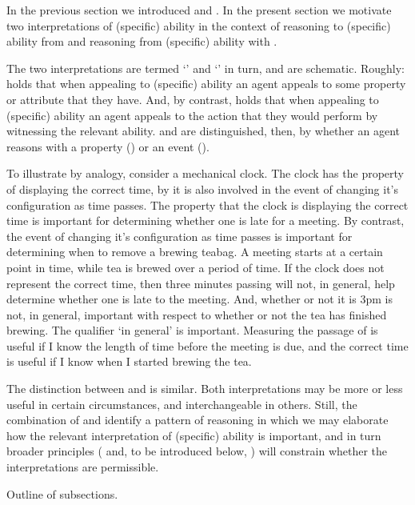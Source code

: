 \begin{note}
  In the previous section we introduced  and .
  In the present section we motivate two interpretations of (specific) ability in the context of reasoning to (specific) ability from \gsi{} and reasoning from (specific) ability with .

  The two interpretations are termed `\AR{}' and `\WR{}' in turn, and are schematic.
  Roughly:
  \AR{} holds that when appealing to (specific) ability an agent appeals to some property or attribute that they have.
  And, by contrast, \WR{} holds that when appealing to (specific) ability an agent appeals to the action that they would perform by witnessing the relevant ability.
  \AR{} and \WR{} are distinguished, then, by whether an agent reasons with a property (\AR{}) or an event (\WR{}).

  To illustrate by analogy, consider a mechanical clock.
  The clock has the property of displaying the correct time, by it is also involved in the event of changing it's configuration as time passes.
  The property that the clock is displaying the correct time is important for determining whether one is late for a meeting.
  By contrast, the event of changing it's configuration as time passes is important for determining when to remove a brewing teabag.
  A meeting starts at a certain point in time, while tea is brewed over a period of time.
  If the clock does not represent the correct time, then three minutes passing will not, in general, help determine whether one is late to the meeting.
  And, whether or not it is 3pm is not, in general, important with respect to whether or not the tea has finished brewing.
  The qualifier `in general' is important.
  Measuring the passage of is useful if I know the length of time before the meeting is due, and the correct time is useful if I know when I started brewing the tea.

  The distinction between \AR{} and \WR{} is similar.
  Both interpretations may be more or less useful in certain circumstances, and interchangeable in others.
  Still, the combination of \gsi{} and  identify a pattern of reasoning in which we may elaborate how the relevant interpretation of (specific) ability is important, and in turn broader principles (\ESU{} and, to be introduced below, \nI{}) will constrain whether the interpretations are permissible.

  {
    \color{red}
    Outline of subsections.
  }
\end{note}

